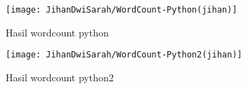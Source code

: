 \begin{enumerate}
\begin{figure}[!ht]
\texttt{[image: JihanDwiSarah/WordCount-Python(jihan)]}
\caption{Hasil wordcount python}
\label{gam:WordCount-Python(jihan)}
\end{figure} 


\begin{figure}[!ht]
\texttt{[image: JihanDwiSarah/WordCount-Python2(jihan)]}
\caption{Hasil wordcount python2}
\label{gam:WordCount-Python2(jihan)}
\end{figure} 

\end{enumerate}

